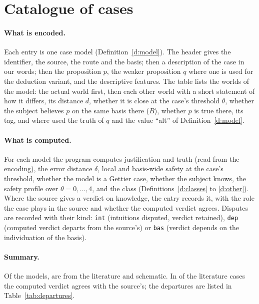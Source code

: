 \documentclass{situationist-preprint}
\begin{document}
\appendix

\section{Catalogue of cases}\label{app:a}

\paragraph{What is encoded.} Each entry is one case model (Definition~\ref{d:model}). The header gives the identifier, the source, the route and the basis; then a description of the case in our words; then the proposition $p$, the weaker proposition $q$ where one is used for the deduction variant, and the descriptive features. The table lists the worlds of the model: the actual world first, then each other world with a short statement of how it differs, its distance $d$, whether it is close at the case's threshold $\theta$, whether the subject believes $p$ on the same basis there ($B$), whether $p$ is true there, its tag, and where used the truth of $q$ and the value \enquote{alt} of Definition~\ref{d:model}.

\paragraph{What is computed.} For each model the program computes justification and truth (read from the encoding), the error distance $\delta$, local and basis-wide safety at the case's threshold, whether the model is a Gettier case, whether the subject knows, the safety profile over $\theta = 0, \ldots, 4$, and the class (Definitions~\ref{d:classes} to \ref{d:other}). Where the source gives a verdict on knowledge, the entry records it, with the role the case plays in the source and whether the computed verdict agrees. Disputes are recorded with their kind: \texttt{int} (intuitions disputed, verdict retained), \texttt{dep} (computed verdict departs from the source's) or \texttt{bas} (verdict depends on the individuation of the basis).

\paragraph{Summary.} Of the \stnsources{} models, \stnlit{} are from the literature and \stnschem{} schematic. In \stnagree{} of the \stnlit{} literature cases the computed verdict agrees with the source's; the \stndepart{} departures are listed in Table~\ref{tab:departures}.
\end{document}
